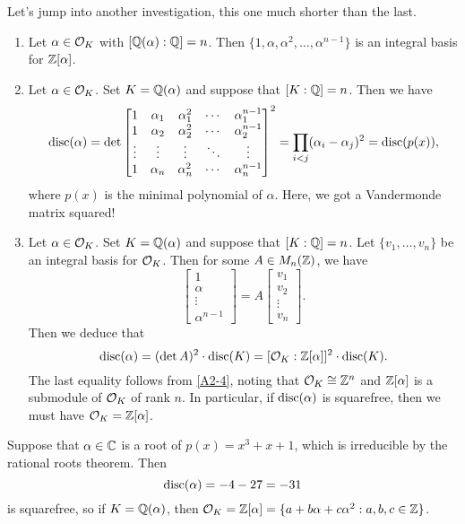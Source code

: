 Let's jump into another investigation, this one much shorter than the last. 
\begin{enumerate}[(1)]
    \item Let $\alpha \in {\cal O}_K$ with $[\mathbb{Q}(\alpha) : \mathbb{Q}] = n$. Then 
    $\{1, \alpha, \alpha^2, \dots, \alpha^{n-1}\}$ is an integral basis 
    for $\mathbb{Z}[\alpha]$. 

    \item Let $\alpha \in {\cal O}_K$. Set $K = \mathbb{Q}(\alpha)$ and suppose that
    $[K : \mathbb{Q}] = n$. Then we have 
    \[ \operatorname{disc}(\alpha) = \det\begin{bmatrix} 
        1 & \alpha_1 & \alpha_1^2 & \cdots & \alpha_1^{n-1} \\ 
        1 & \alpha_2 & \alpha_2^2 & \cdots & \alpha_2^{n-1} \\ 
        \vdots & \vdots & \vdots & \ddots & \vdots \\ 
        1 & \alpha_n & \alpha_n^2 & \cdots & \alpha_n^{n-1}
    \end{bmatrix}^2 = \prod_{i<j} (\alpha_i - \alpha_j)^2 = \operatorname{disc}(p(x)), \] 
    where $p(x)$ is the minimal polynomial of $\alpha$. Here, we got a 
    Vandermonde matrix squared!

    \item Let $\alpha \in {\cal O}_K$. Set $K = \mathbb{Q}(\alpha)$ and suppose that
    $[K : \mathbb{Q}] = n$. Let $\{v_1, \dots, v_n\}$ be an integral basis for 
    ${\cal O}_K$. Then for some $A \in M_n(\mathbb{Z})$, we have 
    \[ \begin{bmatrix} 1 \\ \alpha \\ \vdots \\ \alpha^{n-1} \end{bmatrix} 
    = A \begin{bmatrix} v_1 \\ v_2 \\ \vdots \\ v_n \end{bmatrix}. \] 
    Then we deduce that 
    \[ \operatorname{disc}(\alpha) = (\det A)^2 \cdot \operatorname{disc}(K) = [{\cal O}_K : 
    \mathbb{Z}[\alpha]]^2 \cdot \operatorname{disc}(K). \] 
    The last equality follows from \ref{A2-4}, noting that ${\cal O}_K
    \cong \mathbb{Z}^n$ and $\mathbb{Z}[\alpha]$ is a submodule of ${\cal O}_K$ of rank $n$. 
    In particular, if $\operatorname{disc}(\alpha)$ is squarefree, then we must have 
    ${\cal O}_K = \mathbb{Z}[\alpha]$. 
\end{enumerate}

Suppose that $\alpha \in \mathbb{C}$ is a root of $p(x) = x^3 + x + 1$, which is 
irreducible by the rational roots theorem. Then 
\[ \operatorname{disc}(\alpha) = -4 - 27 = -31 \] 
is squarefree, so if $K = \mathbb{Q}(\alpha)$, then ${\cal O}_K = \mathbb{Z}[\alpha] 
= \{a + b\alpha + c\alpha^2 : a, b, c \in \mathbb{Z}\}$.